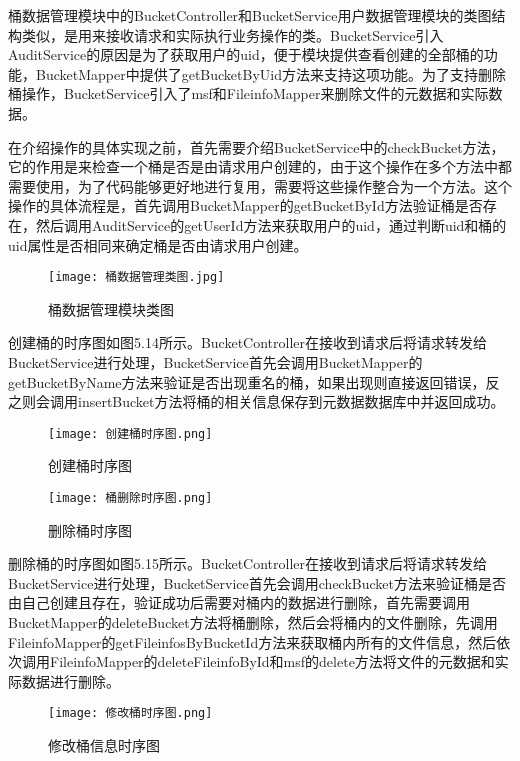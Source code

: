桶数据管理模块中的BucketController和BucketService用户数据管理模块的类图结构类似，是用来接收请求和实际执行业务操作的类。BucketService引入AuditService的原因是为了获取用户的uid，便于模块提供查看创建的全部桶的功能，BucketMapper中提供了getBucketByUid方法来支持这项功能。为了支持删除桶操作，BucketService引入了msf和FileinfoMapper来删除文件的元数据和实际数据。

在介绍操作的具体实现之前，首先需要介绍BucketService中的checkBucket方法，它的作用是来检查一个桶是否是由请求用户创建的，由于这个操作在多个方法中都需要使用，为了代码能够更好地进行复用，需要将这些操作整合为一个方法。这个操作的具体流程是，首先调用BucketMapper的getBucketById方法验证桶是否存在，然后调用AuditService的getUserId方法来获取用户的uid，通过判断uid和桶的uid属性是否相同来确定桶是否由请求用户创建。

\begin{figure}
  \centering
  \texttt{[image: 桶数据管理类图.jpg]}
  \caption{桶数据管理模块类图}
\end{figure}

创建桶的时序图如图5.14所示。BucketController在接收到请求后将请求转发给BucketService进行处理，BucketService首先会调用BucketMapper的getBucketByName方法来验证是否出现重名的桶，如果出现则直接返回错误，反之则会调用insertBucket方法将桶的相关信息保存到元数据数据库中并返回成功。

\begin{figure}
  \centering
  \texttt{[image: 创建桶时序图.png]}
  \caption{创建桶时序图}
\end{figure}

\begin{figure}
  \centering
  \texttt{[image: 桶删除时序图.png]}
  \caption{删除桶时序图}
\end{figure}

删除桶的时序图如图5.15所示。BucketController在接收到请求后将请求转发给BucketService进行处理，BucketService首先会调用checkBucket方法来验证桶是否由自己创建且存在，验证成功后需要对桶内的数据进行删除，首先需要调用BucketMapper的deleteBucket方法将桶删除，然后会将桶内的文件删除，先调用FileinfoMapper的getFileinfosByBucketId方法来获取桶内所有的文件信息，然后依次调用FileinfoMapper的deleteFileinfoById和msf的delete方法将文件的元数据和实际数据进行删除。

\begin{figure}
  \centering
  \texttt{[image: 修改桶时序图.png]}
  \caption{修改桶信息时序图}
\end{figure}

